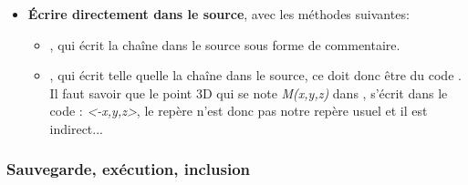 \begin{itemize}
\begin{itemize}
            \item {}, où  est une liste \textbf{deux} objets \povray, ces objets peuvent être, soit le nom d'un objet déjà créé, soit une commande \povray sous forme de chaîne. Le résultat la différence : objet1 moins objet2.
        \end{itemize}
        
    \item \textbf{Écrire directement dans le source}, avec les méthodes suivantes:
        \begin{itemize}
            \item {}, qui écrit la chaîne  dans le source sous forme de commentaire.
            \item {}, qui écrit telle quelle la chaîne  dans le source, ce doit donc être du code \povray. Il faut savoir que le point 3D qui se note \emph{M(x,y,z)} dans \luadrawenv, s'écrit dans le code \povray: \emph{<-x,y,z>}, le repère \povray n'est donc pas notre repère usuel et il est indirect...
        \end{itemize}
\end{itemize}

\subsubsection{Sauvegarde, exécution, inclusion}

